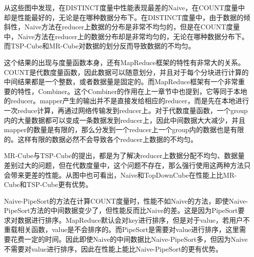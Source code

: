 从这些图中发现，在DISTINCT度量中性能表现最差的Naive，在COUNT度量中却是性能最好的，无论是在哪种数据分布下。在DISTINCT度量中，由于数据的倾斜性，Naive方法在reducer上数据的分布是非常不均匀的，但是在COUNT度量中，Naive方法在reducer上的数据分布却是非常均匀的，无论在哪种数据分布下。而TSP-Cube和MR-Cube对数据的划分反而导致数据的不均匀。

这个结果的出现与度量函数本身，还有MapReduce框架的特性有非常大的关系。COUNT是代数度量函数，因此数据可以随意划分，并且对于每个分块进行计算的中间结果都是一个整数，或者数据量是固定的。而MapReduce框架有一个非常重要的特性，Combiner。这个Combiner的作用在上一章节中也提到，它等同于本地的reducer。mapper产生的输出并不是直接发给相应的reducer，而是先在本地进行一次reduce计算，再通过网络传输发到reducer上。对于代数度量函数，一个group内的大量数据都可以变成一条数据发到reducer上，因此中间数据大大减少，并且mapper的数量是有限的，那么分发到一个reducer上一个group内的数据也是有限的。这样有限的数据必然不会导致各个reducer上数据的不均匀。

MR-Cube与TSP-Cube的提出，都是为了解决reducer上数据分配不均匀、数据量差别过大的问题，但在代数度量中，这个问题不存在，那么强行使用这两种方法只会带来更差的性能。从图中也可看出，Naive和TopDownCube在性能上比MR-Cube和TSP-Cube更有优势。

Naive-PipeSort的方法在计算COUNT度量时，性能不如Naive的方法，即使Naive-PipeSort方法的中间数据变少了，但性能反而比Naive的差。这是因为PipeSort要求对数据进行排序。MapReduce默认会对key进行排序，但是对于value，若用户不重载相关函数，value是不会排序的。而PipeSort是需要对value进行排序，这里需要花费一定的时间。因此即使Naive的中间数据比Naive-PipeSort多，但因为Naive不需要对value进行排序，因此在性能上能比Naive-PipeSort的更有优势。


